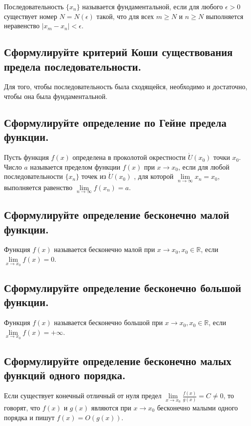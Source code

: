     Последовательность $\{x_n\}$ называется фундаментальной, если для любого $\epsilon > 0$ 
    существует номер $N = N(\epsilon)$ такой, что для всех $m  \geqslant  N$ и $n  \geqslant  N$ выполняется 
    неравенство $| x_m - x_n | < \epsilon$.

    \subsection{Сформулируйте критерий Коши существования предела последовательности.}

    Для того, чтобы последовательность была сходящейся, необходимо и достаточно, чтобы она была фундаментальной.

    \subsection{Сформулируйте определение по Гейне предела функции.}

    Пусть функция $f(x)$ определена в проколотой окрестности $\mathring U(x_0)$ точки $x_0$. 
    Число $a$ называется пределом функции $f(x)$ при $x \to x_0$, если для любой последовательности 
    $\{x_n\}$ точек из $\mathring U(x_0)$ , для которой $\lim\limits_{n \to \infty} x_n = x_0$,
    выполняется равенство $\lim\limits_{n \to \infty} f(x_n) = a$.

    \subsection{Сформулируйте определение бесконечно малой функции.}

    Функция $f(x)$ называется бесконечно малой при $x \to x_0, x_0 \in \mathbb{R}$, если 
    $\lim\limits_{x \to x_0} f(x) = 0$.

    \subsection{Сформулируйте определение бесконечно большой функции.}
    
    Функция $f(x)$ называется бесконечно большой при $x \to x_0, x_0 \in \mathbb{R}$, 
    если $\lim\limits_{x \to x_0} f(x) = +\infty$.

    \subsection{Сформулируйте определение бесконечно малых функций одного порядка.}

    Если существует конечный отличный от нуля предел $\lim\limits_{x \to x_0}\frac{f(x)}{g(x)} = C \ne 0$,
    то говорят, что $f(x)$ и $g(x)$ являются при $x \to x_0$ бесконечно малыми одного порядка и пишут $f(x) = O(g(x))$.

